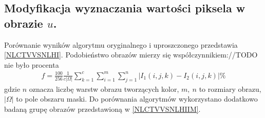 \documentclass[12pt, twoside, openany]{report}
\theoremstyle{definition}
\begin{document}
\subsection{Modyfikacja wyznaczania wartości piksela w obrazie $u$.}
\label{ssec:NLCTVModSec}
Porównanie wyników algorytmu oryginalnego i uproszczonego przedstawia \autoref{NLCTVVSNLHI}. Podobieństwo obrazów mierzy się współczynnikiem://TODO nie było procenta
\begin{align}
f = \frac{100}{256}\frac{1}{c| \Omega |} \sum^c_{k=1}{\sum^m_{i=1}{\sum^n_{j=1}{ | I_1(i,j,k)-I_2(i,j,k) |}}} \%
\end{align}
gdzie $n$ oznacza liczbę warstw obrazu tworzących kolor, $m, \ n$ to rozmiary obrazu, $|\Omega|$ to pole obszaru maski. Do porównania algorytmów wykorzystano dodatkowo badaną grupę obrazów przedstawioną w \autoref{NLCTVVSNLHIIM}.
\end{document}

